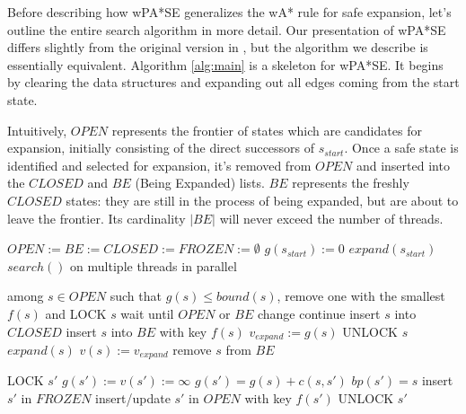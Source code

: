 \documentclass[letterpaper]{article}
\begin{document}
Before describing how wPA*SE generalizes the wA* rule for safe expansion, let's outline the entire search algorithm in more detail. Our presentation of wPA*SE differs slightly from the original version in \cite{phillips2014pa}, but the algorithm we describe is essentially equivalent. Algorithm \ref{alg:main} is a skeleton for wPA*SE. It begins by clearing the data structures and expanding out all edges coming from the start state.

Intuitively, $OPEN$ represents the frontier of states which are candidates for expansion, initially consisting of the direct successors of $s_{start}$. Once a safe state is identified and selected for expansion, it's removed from $OPEN$ and inserted into the $CLOSED$ and $BE$ (Being Expanded) lists. $BE$ represents the freshly $CLOSED$ states: they are still in the process of being expanded, but are about to leave the frontier. Its cardinality $|BE|$ will never exceed the number of threads.

\begin{algorithm}
\caption{$main()$}
\label{alg:main}
\begin{algorithmic}
\STATE $OPEN := BE := CLOSED := FROZEN := \emptyset$
\STATE $g(s_{start}) := 0$
\STATE $expand(s_{start})$
\STATE $search()$ on multiple threads in parallel
\end{algorithmic}
\end{algorithm}

\begin{algorithm}
\caption{$search()$}
\label{alg:search}
\begin{algorithmic}
\STATE among $s\in OPEN$ such that $g(s) \le bound(s)$, remove one with the smallest $f(s)$ and LOCK $s$
\STATE wait until $OPEN$ or $BE$ change
\STATE continue
\ENDIF
\STATE insert $s$ into $CLOSED$
\STATE insert $s$ into $BE$ with key $f(s)$
\STATE $v_{expand} := g(s)$
\STATE UNLOCK $s$
\STATE $expand(s)$
\STATE $v(s) := v_{expand}$
\STATE remove $s$ from $BE$
\ENDWHILE
\end{algorithmic}
\end{algorithm}

\begin{algorithm}
\caption{$expand(s)$}
\label{alg:expand}
\begin{algorithmic}
\STATE LOCK $s'$
\STATE $g(s') := v(s') := \infty$
\ENDIF
{}
\STATE $g(s') = g(s) + c(s,s')$
\STATE $bp(s') = s$
\STATE insert $s'$ in $FROZEN$
\ELSE
\STATE insert/update $s'$ in $OPEN$ with key $f(s')$
\ENDIF
\ENDIF
\STATE UNLOCK $s'$
\ENDFOR
\end{algorithmic}
\end{algorithm}
\end{document}
